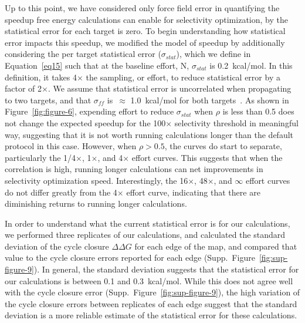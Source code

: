 \documentclass[phd,tocprelim]{cornell}
\begin{document}
Up to this point, we have considered only force field error in quantifying the speedup free energy calculations can enable for selectivity optimization, by the statistical error for each target is zero. 
To begin understanding how statistical error impacts this speedup, we modified the model of speedup by additionally considering the per target statistical error ($\sigma_{stat}$), which we define in Equation~\ref{eq15} such that at the baseline effort, N, $\sigma_{stat}$ is 0.2~kcal/mol. In this definition, it takes 4$\times$ the sampling, or effort, to reduce statistical error by a factor of 2$\times$. 
We assume that statistical error is uncorrelated when propagating to two targets, and that $\sigma_{ff}$ is~$\approx$ 1.0~kcal/mol for both targets~\citep{Harder:J.Chem.TheoryComput.:2016, Hauser:2018vz}. As shown in Figure~\ref{fig:figure-6}, expending effort to reduce $\sigma_{stat}$ when $\rho$ is less than 0.5 does not change the expected speedup for the 100$\times$ selectivity threshold in meaningful way, suggesting that it is not worth running calculations longer than the default protocol in this case. However, when $\rho > 0.5$, the curves do start to separate, particularly the 1/4$\times$, 1$\times$, and 4$\times$ effort curves. This suggests that when the correlation is high, running longer calculations can net improvements in selectivity optimization speed. Interestingly, the 16$\times$, 48$\times$, and $\infty$ effort curves do not differ greatly from the 4$\times$ effort curve, indicating that there are diminishing returns to running longer calculations. 

In order to understand what the current statistical error is for our calculations, we performed three replicates of our calculations, and calculated the standard deviation of the cycle closure $\Delta \Delta G$ for each edge of the map, and compared that value to the cycle closure errors reported for each edge (Supp.~Figure~\ref{fig:sup-figure-9}). 
In general, the standard deviation suggests that the statistical error for our calculations is between 0.1 and 0.3~kcal/mol. While this does not agree well with the cycle closure error (Supp.~Figure~\ref{fig:sup-figure-9}), the high variation of the cycle closure errors between replicates of each edge suggest that the standard deviation is a more reliable estimate of the statistical error for these calculations. 
\end{document}
